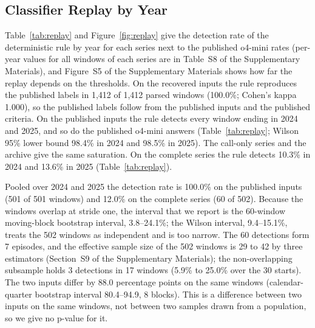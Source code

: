 \subsection{Classifier Replay by Year}
\label{sec:results:replay}

Table~\ref{tab:replay} and Figure~\ref{fig:replay} give the detection rate of the deterministic rule by year for each series next to the published o4-mini rates (per-year values for all windows of each series are in Table~S8 of the Supplementary Materials), and Figure~S5 of the Supplementary Materials shows how far the replay depends on the thresholds.
On the recovered inputs the rule reproduces the published labels in 1{,}412 of 1{,}412 parsed windows (100.0\%; Cohen's kappa 1.000), so the published labels follow from the published inputs and the published criteria. On the published inputs the rule detects every window ending in 2024 and 2025, and so do the published o4-mini answers (Table~\ref{tab:replay}; Wilson 95\% lower bound 98.4\% in 2024 and 98.5\% in 2025). The call-only series and the archive give the same saturation. On the complete series the rule detects 10.3\% in 2024 and 13.6\% in 2025 (Table~\ref{tab:replay}).

Pooled over 2024 and 2025 the detection rate is 100.0\% on the published inputs (501 of 501 windows) and 12.0\% on the complete series (60 of 502). Because the windows overlap at stride one, the interval that we report is the 60-window moving-block bootstrap interval, 3.8--24.1\%; the Wilson interval, 9.4--15.1\%, treats the 502 windows as independent and is too narrow. The 60 detections form 7 episodes, and the effective sample size of the 502 windows is 29 to 42 by three estimators (Section~S9 of the Supplementary Materials); the non-overlapping subsample holds 3 detections in 17 windows (5.9\% to 25.0\% over the 30 starts). The two inputs differ by 88.0 percentage points on the same windows (calendar-quarter bootstrap interval 80.4--94.9, 8 blocks). This is a difference between two inputs on the same windows, not between two samples drawn from a population, so we give no p-value for it.

